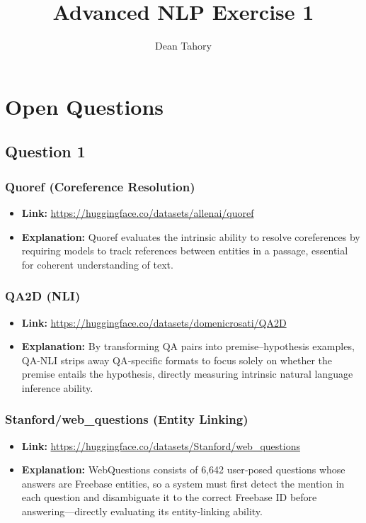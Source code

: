 \documentclass[12pt]{article}
\title{Advanced NLP Exercise 1}
\author{Dean Tahory}
\date{}
\begin{document}
\maketitle

\section{Open Questions}
\subsection*{Question 1}

\subsubsection*{Quoref (Coreference Resolution)}
\begin{itemize}
    \item \textbf{Link:} \url{https://huggingface.co/datasets/allenai/quoref}
    \item \textbf{Explanation:} Quoref evaluates the intrinsic ability to resolve coreferences by requiring models to track references between entities in a passage, essential for coherent understanding of text.
\end{itemize}

\subsubsection*{QA2D (NLI)}
\begin{itemize}
    \item \textbf{Link:} \url{https://huggingface.co/datasets/domenicrosati/QA2D}
    \item \textbf{Explanation:} By transforming QA pairs into premise–hypothesis examples, QA-NLI strips away QA‐specific formats to focus solely on whether the premise entails the hypothesis, directly measuring intrinsic natural language inference ability.
\end{itemize}

\subsubsection*{Stanford\protect/web\_questions (Entity Linking)}
\begin{itemize}
    \item \textbf{Link:} \url{https://huggingface.co/datasets/Stanford/web_questions}
    \item \textbf{Explanation:} WebQuestions consists of 6,642 user‐posed questions whose answers are Freebase entities, so a system must first detect the mention in each question and disambiguate it to the correct Freebase ID before answering—directly evaluating its entity‐linking ability.
\end{itemize}
\end{document}
